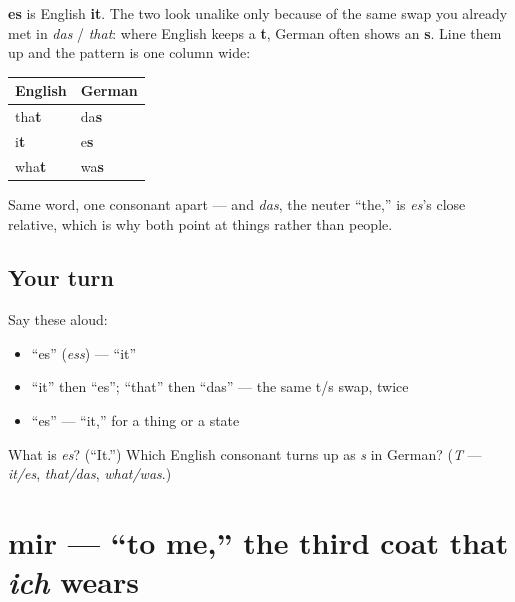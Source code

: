 \begin{cousinweb}
\textbf{es} is English \textbf{it}. The two look unalike only because of the same swap you already met in \emph{das} / \emph{that}: where English keeps a \textbf{t}, German often shows an \textbf{s}. Line them up and the pattern is one column wide:

\noindent
\begin{tabularx}{\linewidth}{@{}>{\raggedright\arraybackslash}X>{\raggedright\arraybackslash}X@{}}
\toprule
\textbf{English} & \textbf{German} \\
\midrule
tha\textbf{t} & da\textbf{s} \\
i\textbf{t} & e\textbf{s} \\
wha\textbf{t} & wa\textbf{s} \\
\bottomrule
\end{tabularx}

Same word, one consonant apart — and \emph{das}, the neuter \textquotedblleft{}the,\textquotedblright{} is \emph{es}'s close relative, which is why both point at things rather than people.
\end{cousinweb}

\subsection*{Your turn}
Say these aloud:

\begin{itemize}
\raggedright
  \item \textquotedblleft{}es\textquotedblright{} (\emph{ess}) — \textquotedblleft{}it\textquotedblright{}
  \item \textquotedblleft{}it\textquotedblright{} then \textquotedblleft{}es\textquotedblright{}; \textquotedblleft{}that\textquotedblright{} then \textquotedblleft{}das\textquotedblright{} — the same t/s swap, twice
  \item \textquotedblleft{}es\textquotedblright{} — \textquotedblleft{}it,\textquotedblright{} for a thing or a state
\end{itemize}

\begin{tcolorbox}[breakable,colback=teal!4,colframe=teal!35!black,title={Before you move on}]
What is \emph{es}? (\textquotedblleft{}It.\textquotedblright{}) Which English consonant turns up as \emph{s} in German? (\emph{T} — \emph{it/es}, \emph{that/das}, \emph{what/was}.)
\end{tcolorbox}
\section[mir]{mir — \textquotedblleft{}to me,\textquotedblright{} the third coat that \emph{ich} wears}

